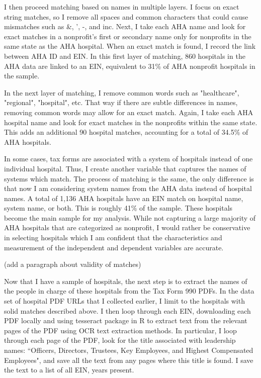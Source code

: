 \documentclass[12pt]{article}
\begin{document}
    I then proceed matching based on names in multiple layers. I focus on exact string matches, so I remove all spaces and common characters that could cause mismatches such as \&, ', -, and inc. Next, I take each AHA name and look for exact matches in a nonprofit's first or secondary name only for nonprofits in the same state as the AHA hospital. When an exact match is found, I record the link between AHA ID and EIN. In this first layer of matching, 860 hospitals in the AHA data are linked to an EIN, equivalent to 31\% of AHA nonprofit hospitals in the sample. 

    In the next layer of matching, I remove common words such as "healthcare", "regional", "hospital", etc. That way if there are subtle differences in names, removing common words may allow for an exact match. Again, I take each AHA hospital name and look for exact matches in the nonprofits within the same state. This adds an additional 90 hospital matches, accounting for a total of 34.5\% of AHA hospitals. 

    In some cases, tax forms are associated with a system of hospitals instead of one individual hospital. Thus, I create another variable that captures the names of systems which match. The process of matching is the same, the only difference is that now I am considering system names from the AHA data instead of hospital names. A total of 1,136 AHA hospitals have an EIN match on hospital name, system name, or both. This is roughly 41\% of the sample. These hospitals become the main sample for my analysis. While not capturing a large majority of AHA hospitals that are categorized as nonprofit, I would rather be conservative in selecting hospitals which I am confident that the characteristics and measurement of the independent and dependent variables are accurate. 

    (add a paragraph about validity of matches)

    Now that I have a sample of hospitals, the next step is to extract the names of the people in charge of these hospitals from the Tax Form 990 PDFs. In the data set of hospital PDF URLs that I collected earlier, I limit to the hospitals with solid matches described above. I then loop through each EIN, downloading each PDF locally and using tesseract package in R to extract text from the relevant pages of the PDF using OCR text extraction methods. In particular, I loop through each page of the PDF, look for the title associated with leadership names: ``Officers, Directors, Trustees, Key Employees, and Highest Compensated Employees", and save all the text from any pages where this title is found. I save the text to a list of all EIN, years present. 
\end{document}
